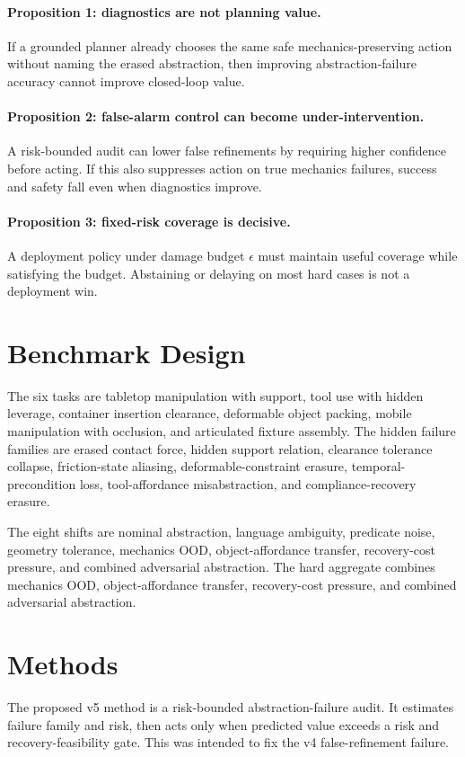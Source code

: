 \documentclass[11pt]{article}
\begin{document}
\paragraph{Proposition 1: diagnostics are not planning value.} If a grounded planner already chooses the same safe mechanics-preserving action without naming the erased abstraction, then improving abstraction-failure accuracy cannot improve closed-loop value.

\paragraph{Proposition 2: false-alarm control can become under-intervention.} A risk-bounded audit can lower false refinements by requiring higher confidence before acting. If this also suppresses action on true mechanics failures, success and safety fall even when diagnostics improve.

\paragraph{Proposition 3: fixed-risk coverage is decisive.} A deployment policy under damage budget $\epsilon$ must maintain useful coverage while satisfying the budget. Abstaining or delaying on most hard cases is not a deployment win.

\section{Benchmark Design}
The six tasks are tabletop manipulation with support, tool use with hidden leverage, container insertion clearance, deformable object packing, mobile manipulation with occlusion, and articulated fixture assembly. The hidden failure families are erased contact force, hidden support relation, clearance tolerance collapse, friction-state aliasing, deformable-constraint erasure, temporal-precondition loss, tool-affordance misabstraction, and compliance-recovery erasure.

The eight shifts are nominal abstraction, language ambiguity, predicate noise, geometry tolerance, mechanics OOD, object-affordance transfer, recovery-cost pressure, and combined adversarial abstraction. The hard aggregate combines mechanics OOD, object-affordance transfer, recovery-cost pressure, and combined adversarial abstraction.

\section{Methods}
The proposed v5 method is a risk-bounded abstraction-failure audit. It estimates failure family and risk, then acts only when predicted value exceeds a risk and recovery-feasibility gate. This was intended to fix the v4 false-refinement failure.
\end{document}
